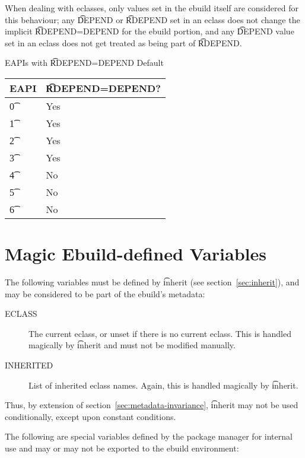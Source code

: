 When dealing with eclasses, only values set in the ebuild itself are considered for this behaviour;
any \t{DEPEND} or \t{RDEPEND} set in an eclass does not change the implicit \t{RDEPEND=DEPEND} for
the ebuild portion, and any \t{DEPEND} value set in an eclass does not get treated as being part of
\t{RDEPEND}.

\begin{centertable}{EAPIs with \t{RDEPEND=DEPEND} Default} \label{tab:rdepend-depend-table}
    \begin{tabular}{ l l }
        \toprule
        \multicolumn{1}{c}{\textbf{EAPI}} &
        \multicolumn{1}{c}{\textbf{\t{RDEPEND=DEPEND}?}} \\
        \midrule
    \t{0} & Yes \\
    \t{1} & Yes \\
    \t{2} & Yes \\
    \t{3} & Yes \\
    \t{4} & No \\
    \t{5} & No \\
    \t{6} & No \\
    \bottomrule
    \end{tabular}
\end{centertable}

\section{Magic Ebuild-defined Variables}

The following variables must be defined by \t{inherit} (see section~\ref{sec:inherit}), and may be
considered to be part of the ebuild's metadata:

\begin{description}
\item[ECLASS] The current eclass, or unset if there is no current eclass. This is handled magically
    by \t{inherit} and must not be modified manually.
\item[INHERITED] List of inherited eclass names. Again, this is handled magically by \t{inherit}.
\end{description}

\note Thus, by extension of section~\ref{sec:metadata-invariance}, \t{inherit} may not be used
    conditionally, except upon constant conditions.

The following are special variables defined by the package manager for internal use and may or may
not be exported to the ebuild environment:

